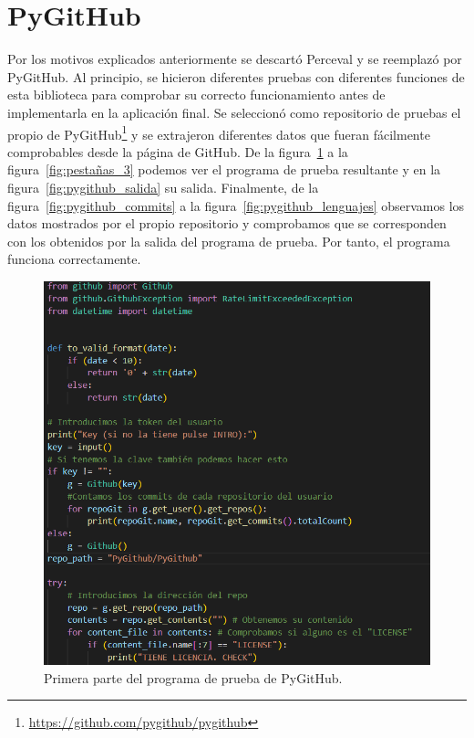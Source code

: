 \documentclass[a4paper, 12pt]{book}
\begin{document}
\section{PyGitHub}
Por los motivos explicados anteriormente se descartó Perceval y se reemplazó por PyGitHub. Al principio, se hicieron diferentes pruebas con diferentes funciones de esta biblioteca para comprobar su correcto funcionamiento antes de implementarla en la aplicación final. Se seleccionó como repositorio de pruebas el propio de PyGitHub\footnote{\url{https://github.com/pygithub/pygithub}} y se extrajeron diferentes datos que fueran fácilmente comprobables desde la página de GitHub. De la figura~\ref{fig:pygithub_1} a la figura~\ref{fig:pestañas_3} podemos ver el programa de prueba resultante y en la figura~\ref{fig:pygithub_salida} su salida. Finalmente, de la figura~\ref{fig:pygithub_commits} a la figura~\ref{fig:pygithub_lenguajes} observamos los datos mostrados por el propio repositorio y comprobamos que se corresponden con los obtenidos por la salida del programa de prueba. Por tanto, el programa funciona correctamente.
\begin{figure}
    \centering
    \includegraphics[width=1\textwidth, keepaspectratio]{img/pygithub_1.png}
    \caption{Primera parte del programa de prueba de PyGitHub.}\label{fig:pygithub_1}
\end{figure}
\end{document}
